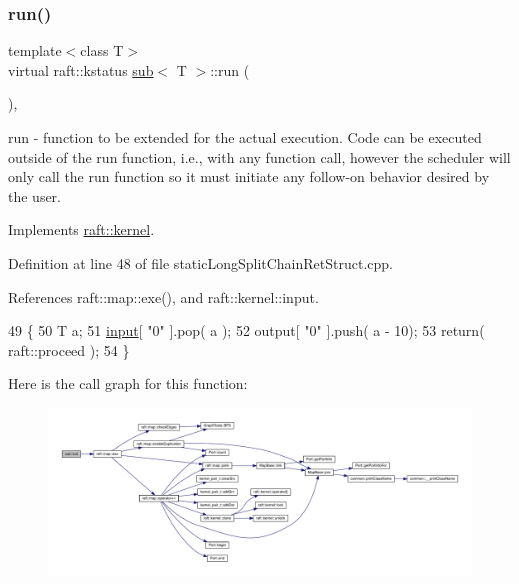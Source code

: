 \subsubsection{\texorpdfstring{run()}{run()}\hspace{0.1cm}{\footnotesize\ttfamily [9/12]}}
{\footnotesize\ttfamily template$<$class T$>$ \\
virtual raft\+::kstatus \hyperlink{classsub}{sub}$<$ T $>$\+::run (\begin{DoxyParamCaption}{ }\end{DoxyParamCaption})\hspace{0.3cm}{\ttfamily [inline]}, {\ttfamily [virtual]}}

run -\/ function to be extended for the actual execution. Code can be executed outside of the run function, i.\+e., with any function call, however the scheduler will only call the run function so it must initiate any follow-\/on behavior desired by the user. 

Implements \hyperlink{classraft_1_1kernel_a05094286d7577360fb1b91c91fc05901}{raft\+::kernel}.



Definition at line 48 of file static\+Long\+Split\+Chain\+Ret\+Struct.\+cpp.



References raft\+::map\+::exe(), and raft\+::kernel\+::input.


\begin{DoxyCode}
49     \{
50         T a;
51         \hyperlink{classraft_1_1kernel_a6edbe35a56409d402e719b3ac36d6554}{input}[ \textcolor{stringliteral}{"0"} ].pop( a );
52         output[ \textcolor{stringliteral}{"0"} ].push( a - 10);
53         \textcolor{keywordflow}{return}( raft::proceed );
54     \}
\end{DoxyCode}
Here is the call graph for this function\+:
\nopagebreak
\begin{figure}[H]
\begin{center}
\leavevmode
\includegraphics[width=350pt]{classsub_a0a0c7461433ee8b5f4b24305282bf69a_cgraph}
\end{center}
\end{figure}
\hypertarget{classsub_a0a0c7461433ee8b5f4b24305282bf69a}{}\label{classsub_a0a0c7461433ee8b5f4b24305282bf69a} 

